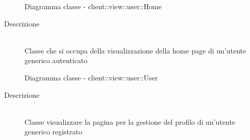 \vspace{0.5cm}
\hypertarget{client::view::user::Home}{}
\begin{figure}[H]
	\centering
	\caption{Diagramma classe - client::view::user::Home}
\end{figure}\begin{description}
\item[Descrizione] \hfill \\
Classe che si occupa della visualizzazione della home page di un'utente generico autenticato
\end{description}

\vspace{0.5cm}
\hypertarget{client::view::user::User}{}
\begin{figure}[H]
	\centering
	\caption{Diagramma classe - client::view::user::User}
\end{figure}\begin{description}
\item[Descrizione] \hfill \\
Classe visualizzare la pagina per la gestione del profilo di un'utente generico registrato
\end{description}

\vspace{0.5cm}
